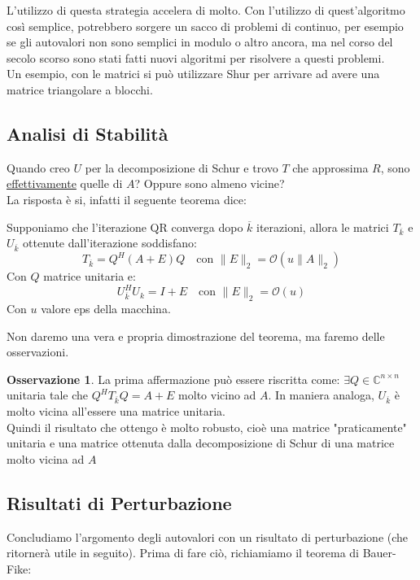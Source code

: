 \documentclass[11pt,a4paper,twoside]{article}
\theoremstyle{definition}
\newtheorem*{oss}{Osservazione}
\begin{document}
L'utilizzo di questa strategia accelera di molto. Con l'utilizzo di quest'algoritmo così semplice, potrebbero sorgere un sacco di problemi di continuo, per esempio se gli autovalori non sono semplici in modulo o altro ancora, ma nel corso del secolo scorso sono stati fatti nuovi algoritmi per risolvere a questi problemi.\\
Un esempio, con le matrici si può utilizzare Shur per arrivare ad avere una matrice triangolare a blocchi.

\subsection{Analisi di Stabilità}

Quando creo $U$ per la decomposizione di Schur e trovo $T$ che approssima $R$, sono \underline{effettivamente} quelle di $A$? Oppure sono almeno vicine?\\
La risposta è si, infatti il seguente teorema dice:

\begin{thm}{}{}
	Supponiamo che l'iterazione QR converga dopo $\overline k$ iterazioni, allora le matrici $T_{\overline k}$ e $U_{\overline k}$ ottenute dall'iterazione soddisfano:
	\[ T_{\overline k} = Q^H(A + E)Q \quad \text{con }\|E\|_2 = \mathcal O(u \| A\|_2) \]
	Con $Q$ matrice unitaria e:
	\[ U^H_{\overline k} U_k = I+E \quad \text{con }\|E\|_2 = \mathcal O(u) \]
	Con $u$ valore eps della macchina.
\end{thm}

Non daremo una vera e propria dimostrazione del teorema, ma faremo delle osservazioni.

\begin{oss}
	La prima affermazione può essere riscritta come: $\exists Q \in \mathbb C^{n \times n}$ unitaria tale che $Q^H T_{\overline k} Q= A+E$ molto vicino ad $A$.
	In maniera analoga, $U_{\overline k}$ è molto vicina all'essere una matrice unitaria.\\
	Quindi il risultato che ottengo è molto robusto, cioè una matrice "praticamente" unitaria e una matrice ottenuta dalla decomposizione di Schur di una matrice molto vicina ad $A$
\end{oss}

\subsection{Risultati di Perturbazione}

Concludiamo l'argomento degli autovalori con un risultato di perturbazione (che ritornerà utile in seguito).
Prima di fare ciò, richiamiamo il teorema di Bauer-Fike:
\end{document}
